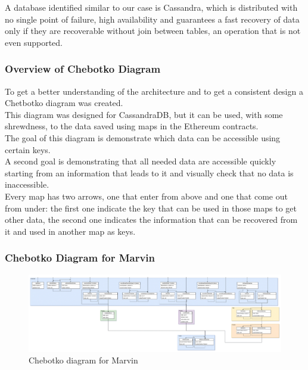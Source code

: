 \documentclass[ManualeSviluppatore.tex]{subfiles}
\begin{document}
A database identified similar to our case is Cassandra, which is distributed with no single point of failure, high availability and guarantees a fast recovery of data only if they are recoverable without join between tables, an operation that is not even supported.\\

\subsubsection{Overview of Chebotko Diagram}
To get a better understanding of the architecture and to get a consistent design a Chetbotko diagram was created.\\
This diagram was designed for CassandraDB, but it can be used, with some shrewdness, to the data saved using maps in the Ethereum contracts.\\
The goal of this diagram is demonstrate which data can be accessible using certain keys.\\
A second goal is demonstrating that all needed data are accessible quickly starting from an information that leads to it and visually check that no data is inaccessible.\\
Every map has two arrows, one that enter from above and one that come out from under: the first one indicate the key that can be used in those maps to get other data, the second one indicates the information that can be recovered from it and used in another map as keys.\\

\begin{landscape}
\newpage
\subsubsection{Chebotko Diagram for Marvin}
\begin{figure}[h]
	\centering
	\includegraphics[width=1\linewidth]{"diagrammi/Chebotko Diagram"}
	\caption{Chebotko diagram for Marvin}
	\label{fig:Chebotko diagram for Marvin}
\end{figure}
\end{landscape}
\newpage
\end{document}
